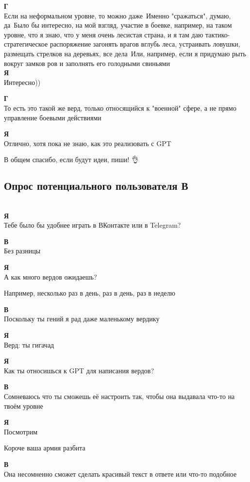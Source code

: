 \textbf{Г}\\
Если на неформальном уровне, то можно даже\
Именно "сражаться", думаю, да\
Было бы интересно, на мой взгляд, участие в боевке, например, на таком уровне, что я знаю, что у меня очень лесистая страна, и я там даю тактико-стратегическое распоряжение загонять врагов вглубь леса, устраивать ловушки, размещать стрелков на деревьях, все дела\
Или, например, если я придумаю рыть вокруг замков ров и заполнять его голодными свиньями\\

\textbf{Я}\\
Интересно))

\textbf{Г}\\
То есть это такой же верд, только относящийся к "военной" сфере, а не прямо управление боевыми действиями

\textbf{Я}\\
Отлично, хотя пока не знаю, как это реализовать с GPT

В общем спасибо, если будут идеи, пиши! 👌

\subsection*{Опрос потенциального пользователя В}\\
\textbf{Я}\\
Тебе было бы удобнее играть в ВКонтакте или в Telegram?

\textbf{В}\\
Без разницы

\textbf{Я}\\
А как много вердов ожидаешь?

Например, несколько раз в день, раз в день, раз в неделю

\textbf{В}\\
Поскольку ты гений я рад даже маленькому вердику

\textbf{Я}\\
Верд: ты гигачад

\textbf{Я}\\
Как ты относишься к GPT для написания вердов?

\textbf{В}\\
Сомневаюсь что ты сможешь её настроить так, чтобы она выдавала что-то на твоём уровне

\textbf{Я}\\
Посмотрим

Короче ваша армия разбита

\textbf{В}\\
Она несомненно сможет сделать красивый текст в ответе или что-то подобное

